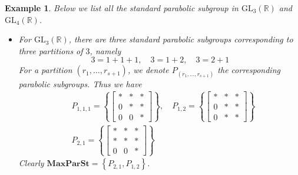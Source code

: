 \documentclass[12pt]{article} %
\newtheorem{example}[definition]{Example}
\begin{document}
\begin{example}
    Below we list all the standard parabolic subgroup in $\text{GL}_3(\mathbb{R})$ and $\text{GL}_4(\mathbb{R})$.
    \begin{itemize}
        \item For $\text{GL}_3(\mathbb{R})$, there are three standard parabolic subgroups corresponding to
              three partitions of $3$, namely
              \[ 3 = 1+ 1+ 1, \quad 3 =1+2 , \quad 3 = 2+1\]
              For a partition $(r_1,\ldots,r_{s+1})$, we denote $P_{(r_1,\ldots,r_{s+1})}$ the corresponding parabolic subgroups. Thus we have
              \begin{align*}
                   & P_{1,1,1} = \left\lbrace \begin{bmatrix}
                                                  \ast & \ast & \ast \\
                                                  0    & \ast & \ast \\
                                                  0    & 0    & \ast
                                              \end{bmatrix}\right\rbrace, \quad P_{1,2} =\left\lbrace \begin{bmatrix}
                                                                                                          \ast & \ast & \ast \\
                                                                                                          0    & \ast & \ast \\
                                                                                                          0    & \ast & \ast
                                                                                                      \end{bmatrix}\right\rbrace \\
                   & P_{2,1} = \left\lbrace \begin{bmatrix}
                                                \ast & \ast & \ast \\
                                                \ast & \ast & \ast \\
                                                0    & 0    & \ast
                                            \end{bmatrix}\right\rbrace
              \end{align*}
              Clearly $\textbf{MaxParSt} = \left\lbrace P_{2,1}, P_{1,2}\right\rbrace$.

\end{itemize}
\end{example}
\end{document}

